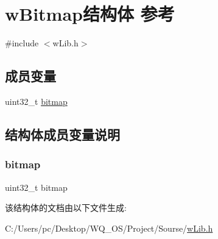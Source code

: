 \hypertarget{structw_bitmap}{}\section{w\+Bitmap结构体 参考}
\label{structw_bitmap}


{\ttfamily \#include $<$w\+Lib.\+h$>$}

\subsection*{成员变量}
\begin{DoxyCompactItemize}
\item 
uint32\+\_\+t \mbox{\hyperlink{structw_bitmap_adc5b4308ed7b0d1a073896de1d25636a}{bitmap}}
\end{DoxyCompactItemize}


\subsection{结构体成员变量说明}
\mbox{\label{structw_bitmap_adc5b4308ed7b0d1a073896de1d25636a}} 
\subsubsection{\texorpdfstring{bitmap}{bitmap}}
{\footnotesize\ttfamily uint32\+\_\+t bitmap}



该结构体的文档由以下文件生成\+:\begin{DoxyCompactItemize}
\item 
C\+:/\+Users/pc/\+Desktop/\+W\+Q\+\_\+\+O\+S/\+Project/\+Sourse/\mbox{\hyperlink{w_lib_8h}{w\+Lib.\+h}}\end{DoxyCompactItemize}
